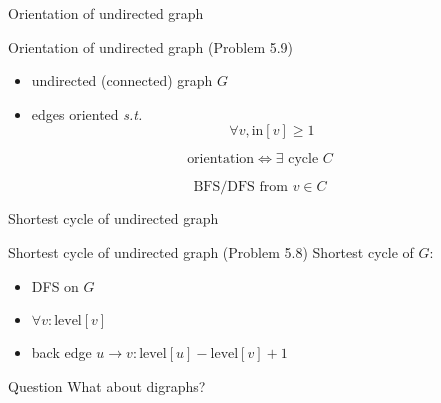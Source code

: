 \begin{frame}{Orientation of undirected graph}
  \begin{exampleblock}{Orientation of undirected graph (Problem 5.9)}
	\begin{itemize}
      \item undirected (connected) graph $G$ 
	  \item edges oriented \emph{s.t.} 
		\[
		  \forall v, \text{in}[v] \ge 1
		\]
	\end{itemize}
  \end{exampleblock}

  \pause
  \[
	\text{orientation} \iff \exists \text{ cycle } C
  \]

  \pause
  \[
	\text{BFS/DFS from } v \in C
  \]
\end{frame}
\begin{frame}{Shortest cycle of undirected graph}
  \begin{exampleblock}{Shortest cycle of undirected graph (Problem 5.8)}
	Shortest cycle of $G$:
	\begin{itemize}
	  \item DFS on $G$
	  \item $\forall v: \text{level}[v]$
	  \item back edge $u \to v: \text{level}[u] - \text{level}[v] + 1$
	\end{itemize}
  \end{exampleblock}

  \pause
  \begin{alertblock}{Question}
	What about digraphs?
  \end{alertblock}
\end{frame}
